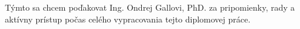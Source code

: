 \noindent \par Týmto sa chcem poďakovat Ing. Ondrej Gallovi, PhD. za pripomienky, rady a aktívny prístup počas celého vypracovania tejto diplomovej práce.